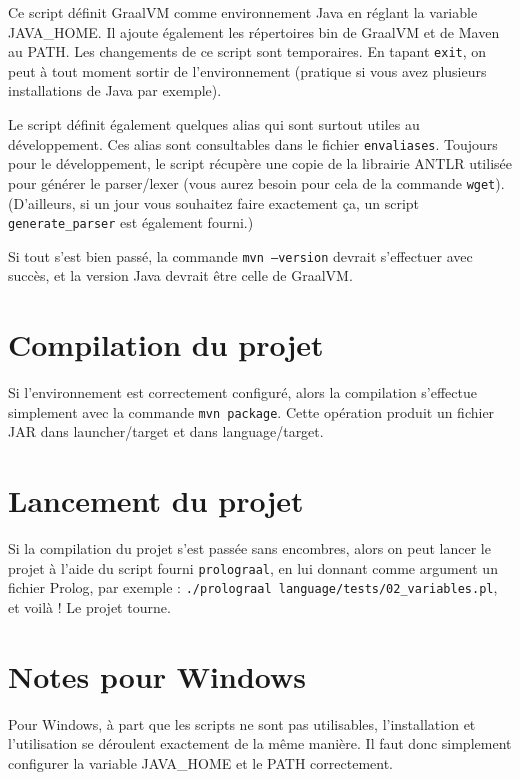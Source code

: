 \documentclass[a4paper, 12pt]{article}
\begin{document}
Ce script définit GraalVM comme environnement Java en réglant la variable JAVA\_HOME. Il ajoute également les répertoires bin de GraalVM et de Maven au PATH. Les changements de ce script sont temporaires. En tapant \texttt{exit}, on peut à tout moment sortir de l'environnement (pratique si vous avez plusieurs installations de Java par exemple).

Le script définit également quelques alias qui sont surtout utiles au développement. Ces alias sont consultables dans le fichier \texttt{envaliases}. Toujours pour le développement, le script récupère une copie de la librairie ANTLR utilisée pour générer le parser/lexer (vous aurez besoin pour cela de la commande \texttt{wget}). (D'ailleurs, si un jour vous souhaitez faire exactement ça, un script \texttt{generate\_parser} est également fourni.)

Si tout s'est bien passé, la commande \texttt{mvn --version} devrait s'effectuer avec succès, et la version Java devrait être celle de GraalVM.
\section{Compilation du projet}
Si l'environnement est correctement configuré, alors la compilation s'effectue simplement avec la commande \texttt{mvn package}. Cette opération produit un fichier JAR dans launcher/target et dans language/target. 
\section{Lancement du projet}
Si la compilation du projet s'est passée sans encombres, alors on peut lancer le projet à l'aide du script fourni \texttt{prolograal}, en lui donnant comme argument un fichier Prolog, par exemple : \texttt{./prolograal language/tests/02\_variables.pl}, et voilà ! Le projet tourne.
\section{Notes pour Windows}
Pour Windows, à part que les scripts ne sont pas utilisables, l'installation et l'utilisation se déroulent exactement de la même manière. Il faut donc simplement configurer la variable JAVA\_HOME et le PATH correctement.
\end{document}
